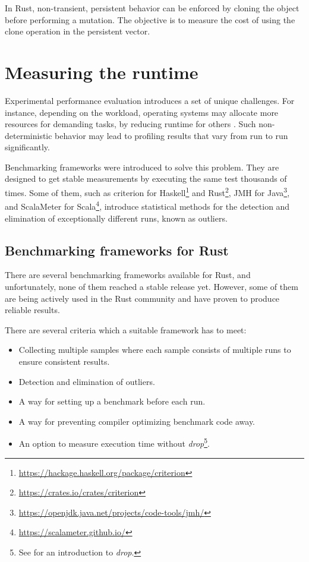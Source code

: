 In Rust, non-transient, persistent behavior can be enforced by cloning the object before performing a mutation. The objective is to measure the cost of using the clone operation in the persistent vector.

\section{Measuring the runtime}
Experimental performance evaluation introduces a set of unique challenges. For instance, depending on the workload, operating systems may allocate more resources for demanding tasks, by reducing runtime for others \cite{statistically-rigorous-java-performance-evaluation}. Such non-deterministic behavior may lead to profiling results that vary from run to run significantly.

Benchmarking frameworks were introduced to solve this problem. They are designed to get stable measurements by executing the same test thousands of times. Some of them, such as criterion for Haskell\footnote{\url{https://hackage.haskell.org/package/criterion}} and Rust\footnote{\url{https://crates.io/crates/criterion}}, JMH for Java\footnote{\url{https://openjdk.java.net/projects/code-tools/jmh/}}, and ScalaMeter for Scala\footnote{\url{https://scalameter.github.io/}}, introduce statistical methods for the detection and elimination of exceptionally different runs, known as outliers.

\subsection{Benchmarking frameworks for Rust}
There are several benchmarking frameworks available for Rust, and unfortunately, none of them reached a stable release yet. However, some of them are being actively used in the Rust community and have proven to produce reliable results.

There are several criteria which a suitable framework has to meet:
\begin{itemize}
    \item Collecting multiple samples where each sample consists of multiple runs to ensure consistent results.
    \item Detection and elimination of outliers.
    \item A way for setting up a benchmark before each run.
    \item A way for preventing compiler optimizing benchmark code away.
    \item An option to measure execution time without \emph{drop}\footnote{See  for an introduction to \emph{drop}.}.
\end{itemize}

